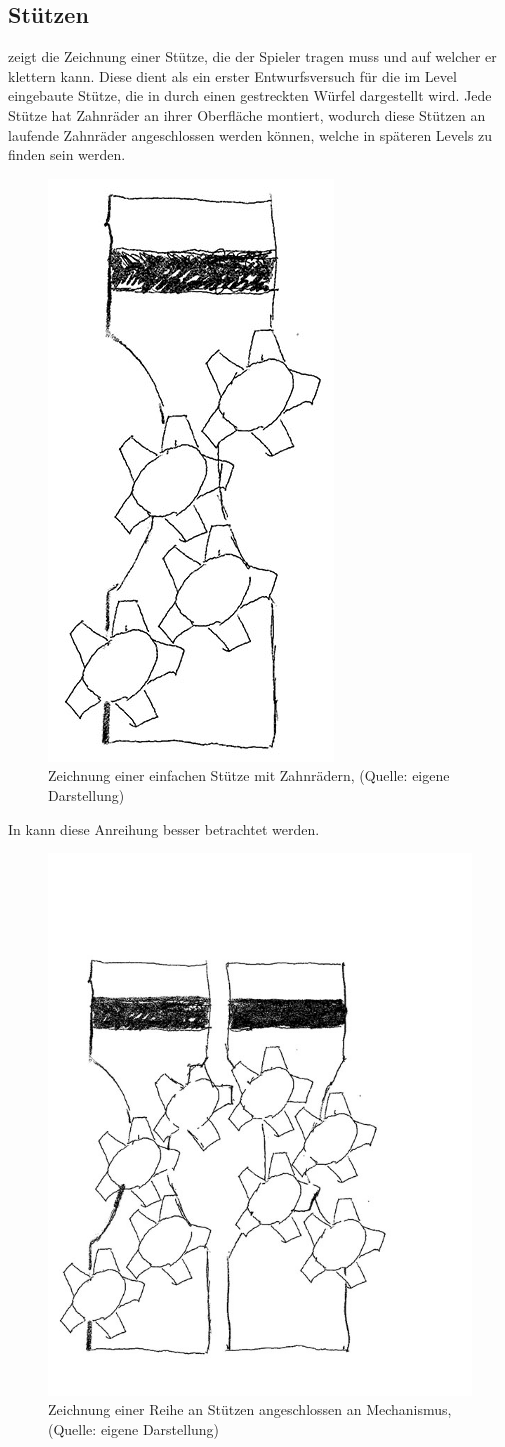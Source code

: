 \subsection{Stützen}
 zeigt die Zeichnung einer Stütze, die der Spieler tragen muss und auf welcher er klettern kann. Diese dient als ein erster Entwurfsversuch für die im Level eingebaute Stütze, die in  durch einen gestreckten Würfel dargestellt wird. Jede Stütze hat Zahnräder an ihrer Oberfläche montiert, wodurch diese Stützen an laufende Zahnräder angeschlossen werden können, welche in späteren Levels zu finden sein werden.
\begin{figure}[ht]
\centering
\includegraphics[width=0.2\linewidth]{content/pictures/Stuetze_01.jpg}
\caption{Zeichnung einer einfachen Stütze mit Zahnrädern, (Quelle: eigene Darstellung)}
\label{fig:stuetze_01}
\end{figure}

In  kann diese Anreihung besser betrachtet werden.  

\begin{figure}[ht]
\centering
\includegraphics[width=0.4\linewidth]{content/pictures/Stuetze_02.jpg}
\caption{Zeichnung einer Reihe an Stützen angeschlossen an Mechanismus, (Quelle: eigene Darstellung)}
\label{fig:stuetze_02}
\end{figure}

